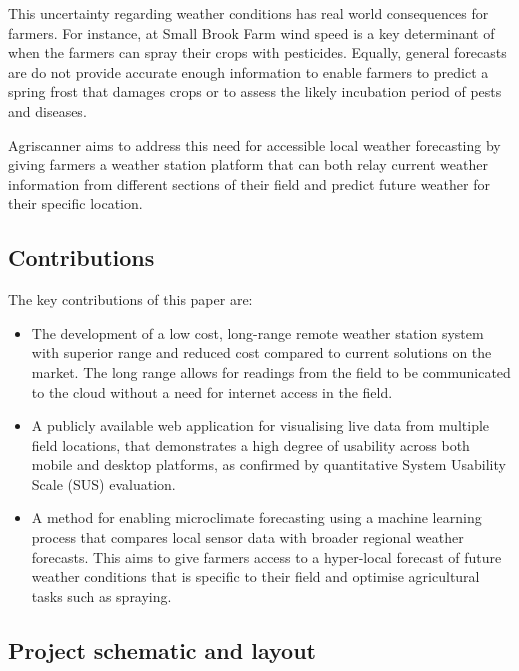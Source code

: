This uncertainty regarding weather conditions has real world consequences for
farmers. For instance, at Small Brook Farm wind speed is a key determinant of
when the farmers can spray their crops with pesticides. Equally, general
forecasts are do not provide accurate enough information to enable farmers to
predict a spring frost that damages crops or to assess the likely incubation
period of pests and diseases.

Agriscanner aims to address this need for accessible local weather forecasting
by giving farmers a weather station platform that can both relay current weather
information from different sections of their field and predict future weather
for their specific location.

\subsection{Contributions}

The key contributions of this paper are:

\begin{itemize}
    \item The development of a low cost, long-range remote weather station
          system with superior range and reduced cost compared to current
          solutions on the market. The long range allows for readings from the
          field to be communicated to the cloud without a need for internet
          access in the field.
    \item A publicly available web application for visualising live data from
          multiple field locations, that demonstrates a high degree of usability
          across both mobile and desktop platforms, as confirmed by quantitative
          System Usability Scale (SUS) evaluation.
    \item A method for enabling microclimate forecasting using a machine
          learning process that compares local sensor data with broader regional
          weather forecasts. This aims to give farmers access to a hyper-local
          forecast of future weather conditions that is specific to their field
          and optimise agricultural tasks such as spraying.
\end{itemize} 

\subsection{Project schematic and layout}

